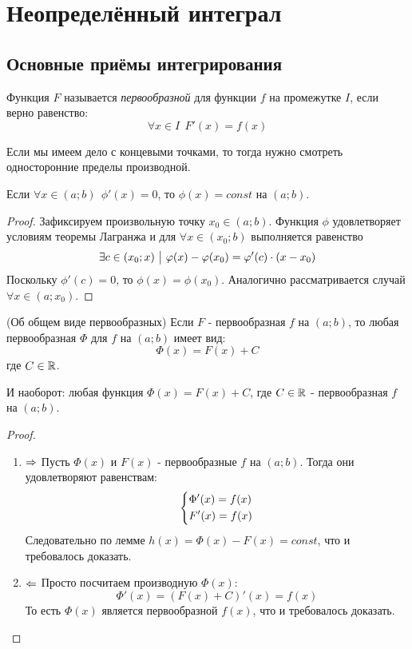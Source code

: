 \section{Неопределённый интеграл}

\subsection{Основные приёмы интегрирования}

\begin{definition}
	Функция $F$ называется \textit{первообразной} для функции $f$ на промежутке $I$, если верно равенство:
	\[
		\forall x \in I\ \ F'(x) = f(x)
	\]
\end{definition}

\begin{note}
	Если мы имеем дело с концевыми точками, то тогда нужно смотреть односторонние пределы производной.
\end{note}

\begin{lemma}
	Если $\forall x \in (a; b)\ \ \phi'(x) = 0$, то $\phi(x) = const$ на $(a; b)$.
\end{lemma}

\begin{proof}
	Зафиксируем произвольную точку $x_0 \in (a; b)$. Функция $\phi$ удовлетворяет условиям теоремы Лагранжа и для $\forall x \in (x_0; b)$ выполняется равенство
	\[
		\exists c \in (x_0; x) \ \big|\  \varphi(x) - \varphi(x_0) = \varphi'(c) \cdot (x - x_0)
	\]
	Поскольку $\phi'(c) = 0$, то $\phi(x) = \phi(x_0)$. Аналогично рассматривается случай $\forall x \in (a; x_0)$.
\end{proof}

\begin{theorem} (Об общем виде первообразных) \label{commonViewTheorem}
	Если $F$ - первообразная $f$ на $(a; b)$, то любая первообразная $\Phi$ для $f$ на $(a; b)$ имеет вид:
	\[
		\Phi(x) = F(x) + C
	\]
	где $C \in \mathbb{R}$.
	
	И наоборот: любая функция $\Phi(x) = F(x) + C$, где $C \in \mathbb{R}$ - первообразная $f$ на $(a; b)$.
\end{theorem}

\begin{proof}~
	\begin{enumerate}
		\item $\Rightarrow$ Пусть $\Phi(x)$ и $F(x)$ - первообразные $f$ на $(a; b)$. Тогда они удовлетворяют равенствам:
		\[
			\left\{\begin{aligned}
				&{\Phi'(x) = f(x)}
				\\
				&{F'(x) = f(x)}
			\end{aligned}\right.
		\]
		Следовательно по лемме $h(x) = \Phi(x) - F(x) = const$, что и требовалось доказать.
		
		\item $\Leftarrow$ Просто посчитаем производную $\Phi(x)$:
		\[
			\Phi'(x) = (F(x) + C)'(x) = f(x)
		\]
		То есть $\Phi(x)$ является первообразной $f(x)$, что и требовалось доказать.
	\end{enumerate}
\end{proof}
